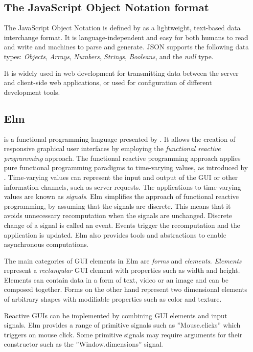 \subsection{The JavaScript Object Notation format}
The JavaScript Object Notation is defined by \citet{rfc8259} as a lightweight, text-based data interchange format.
It is language-independent and easy for both humans to read and write and machines to parse and generate.
JSON supports the following data types: \emph{Objects}, \emph{Arrays}, \emph{Numbers}, \emph{Strings}, \emph{Booleans}, and the \emph{null} type.

It is widely used in web development for transmitting data between the server and client-side web applications,
or used for configuration of different development tools.

\subsection{Elm}
\citet{eml} is a functional programming language presented by \citet{Czaplicki_Chong_2013}.
It allows the creation of responsive graphical user interfaces by employing the
\emph{functional reactive programming} approach.
The functional reactive programming approach applies pure functional programming paradigms to time-varying values, as introduced by \citet{Elliott_Hudak_1997}.
Time-varying values can represent the input and output of the GUI or other information
channels, such as server requests. The applications to time-varying values are known
as \emph{signals}. Elm simplifies the approach of functional reactive programming,
by assuming that the signals are discrete. This means that it avoids unnecessary
recomputation when the signals are unchanged. Discrete change of a signal is called
an event. Events trigger the recomputation and the application is updated. Elm also
provides tools and abstractions to enable asynchronous computations.

The main categories of GUI elements in Elm are \emph{forms} and \emph{elements}.
\emph{Elements} represent a \emph{rectangular} GUI element with properties such as width and height. Elements
can contain data in a form of text, video or an image and can be composed together.
Forms on the other hand represent two dimensional elements of arbitrary shapes with
modifiable properties such as color and texture.

Reactive GUIs can be implemented by combining GUI elements and input signals.
Elm provides a range of primitive signals such as ”Mouse.clicks” which triggers on
mouse click. Some primitive signals may require arguments for their constructor such
as the ”Window.dimensions” signal.

